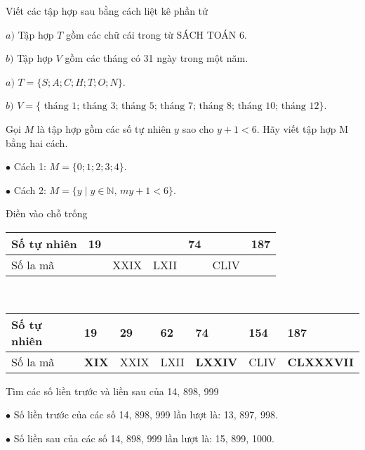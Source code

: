 \begin{bt}
	Viết các tập hợp sau bằng cách liệt kê phần tử
	
	$a)$ Tập hợp $T$ gồm các chữ cái trong từ SÁCH TOÁN 6.
	
	$b)$ Tập hợp $V$ gồm các tháng có 31 ngày trong một năm.
	\begin{loigiaichuong1}
		$a)$	$T = \{S; A; C; H; T; O; N \}$.
		
		$b)$	$V =\{\text{ tháng 1; tháng 3; tháng 5; tháng 7; tháng 8; tháng 10; tháng 12}\}$.
	\end{loigiaichuong1}
\end{bt}
\begin{bt}
	Gọi $M$ là tập hợp gồm các số tự nhiên $y$ sao cho $y+1<6$. Hãy viết tập hợp M bằng hai cách.
	\begin{loigiaichuong1}
		$\bullet$	Cách 1: $M = \{0; 1; 2; 3; 4\}$.
		
		$\bullet$	Cách 2: $M = \{ y \mid y \in \mathbb{N},\, m y + 1 < 6\}$.
	\end{loigiaichuong1}
\end{bt}
\begin{bt}
	Điền vào chỗ trống
	\begin{center}
		\renewcommand{\arraystretch}{1.1}
		\begin{tabularx}{\textwidth}{|p{2cm}|*{6}{Y|} }
			\hline
			Số tự nhiên&	19&	&	&	74&	&	187\\
			\hline
			Số la mã&	&	XXIX&	LXII&	&	CLIV&	\\
			\hline
		\end{tabularx}
	\end{center}
	\begin{loigiaichuong1}
		\,\\
			\renewcommand{\arraystretch}{1.1}
			\begin{tabularx}{\textwidth}{|p{2cm}|*{6}{Y|} }
				\hline
				Số tự nhiên&	19&	\textbf{29} & \textbf{62}	&	74&	\textbf{154}&	187\\
				\hline
				Số la mã&	\textbf{XIX}&	XXIX&	LXII&	\textbf{LXXIV}&	CLIV&	\textbf{CLXXXVII}\\
				\hline
			\end{tabularx}
	\end{loigiaichuong1}	
\end{bt}
\begin{bt}
	Tìm các số liền trước và liền sau của 14, 898, 999
	\begin{loigiaichuong1}
		$\bullet$	Số liền trước của các số 14, 898, 999 lần lượt là: 13, 897, 998.
		
		$\bullet$	Số liền sau của các số 14, 898, 999 lần lượt là: 15, 899, 1000.
	\end{loigiaichuong1}
\end{bt} 
